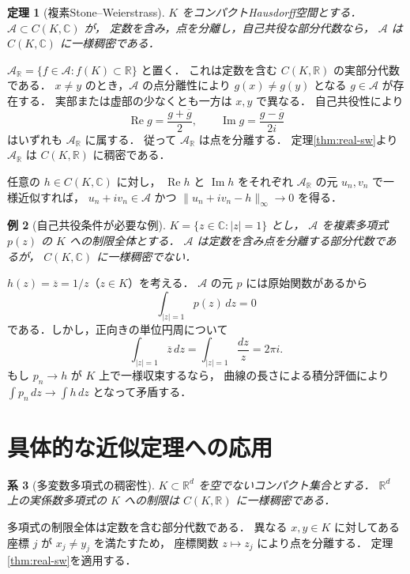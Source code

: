 \documentclass[a5paper,10pt,onecolumn]{jsarticle}
\makeatletter
\theoremstyle{mathnotetheorem}
\newtheorem{theorem}{定理}[section]
\newtheorem{corollary}[theorem]{系}
\newtheorem{example}[theorem]{例}
\renewcommand{\proofname}{証明}
\renewenvironment{proof}[1][\proofname]{%
  \par\pushQED{\qed}\normalfont\topsep4\p@\@plus2\p@\relax
  \trivlist\item[\hskip\labelsep\bfseries #1]\ignorespaces
}{\popQED\endtrivlist\@endpefalse}
\newcommand{\norm}[1]{\lVert #1\rVert}
\makeatother
\begin{document}
\begin{theorem}[複素Stone--Weierstrass]\label{thm:complex-sw}
$K$ をコンパクトHausdorff空間とする．
$\mathcal A\subset C(K,\mathbb C)$ が，
定数を含み，点を分離し，自己共役な部分代数なら，
$\mathcal A$ は $C(K,\mathbb C)$ に一様稠密である．
\end{theorem}
\begin{proof}
$\mathcal A_\mathbb R=\{f\in\mathcal A:
 f(K)\subset\mathbb R\}$ と置く．
これは定数を含む $C(K,\mathbb R)$ の実部分代数である．
$x\ne y$ のとき，$\mathcal A$ の点分離性により
$g(x)\ne g(y)$ となる $g\in\mathcal A$ が存在する．
実部または虚部の少なくとも一方は $x,y$ で異なる．
自己共役性により
\[
 \operatorname{Re}g=\frac{g+\overline g}{2},\qquad
 \operatorname{Im}g=\frac{g-\overline g}{2i}
\]
はいずれも $\mathcal A_\mathbb R$ に属する．
従って $\mathcal A_\mathbb R$ は点を分離する．
定理\ref{thm:real-sw}より
$\mathcal A_\mathbb R$ は $C(K,\mathbb R)$ に稠密である．

任意の $h\in C(K,\mathbb C)$ に対し，
$\operatorname{Re}h$ と $\operatorname{Im}h$ をそれぞれ
$\mathcal A_\mathbb R$ の元 $u_n,v_n$ で一様近似すれば，
$u_n+iv_n\in\mathcal A$ かつ
$\norm{u_n+iv_n-h}_\infty\to0$ を得る．
\end{proof}

\begin{example}[自己共役条件が必要な例]
$K=\{z\in\mathbb C:|z|=1\}$ とし，
$\mathcal A$ を複素多項式 $p(z)$ の $K$ への制限全体とする．
$\mathcal A$ は定数を含み点を分離する部分代数であるが，
$C(K,\mathbb C)$ に一様稠密でない．
\end{example}
\begin{proof}
$h(z)=\overline z=1/z$（$z\in K$）を考える．
$\mathcal A$ の元 $p$ には原始関数があるから
\[
 \int_{|z|=1}p(z)\,dz=0
\]
である．しかし，正向きの単位円周について
\[
 \int_{|z|=1}\overline z\,dz
 =\int_{|z|=1}\frac{dz}{z}=2\pi i.
\]
もし $p_n\to h$ が $K$ 上で一様収束するなら，
曲線の長さによる積分評価により
$\int p_n\,dz\to\int h\,dz$ となって矛盾する．
\end{proof}

\section{具体的な近似定理への応用}

\begin{corollary}[多変数多項式の稠密性]
$K\subset\mathbb R^d$ を空でないコンパクト集合とする．
$\mathbb R^d$ 上の実係数多項式の $K$ への制限は
$C(K,\mathbb R)$ に一様稠密である．
\end{corollary}
\begin{proof}
多項式の制限全体は定数を含む部分代数である．
異なる $x,y\in K$ に対してある座標 $j$ が
$x_j\ne y_j$ を満たすため，
座標関数 $z\mapsto z_j$ により点を分離する．
定理\ref{thm:real-sw}を適用する．
\end{proof}
\end{document}
